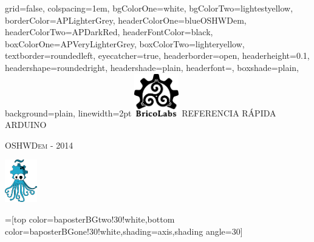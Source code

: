 \documentclass[landscape,final,a0paper]{baposter}
\begin{document}
\newlength{\leftimgwidth}
\begin{poster}%
  {
  grid=false, %
  colspacing=1em, %
  bgColorOne=white,
  bgColorTwo=lightestyellow,
  borderColor=APLighterGrey,
  headerColorOne=blueOSHWDem,
  headerColorTwo=APDarkRed,
  headerFontColor=black,
  boxColorOne=APVeryLighterGrey,
  boxColorTwo=lighteryellow,
  textborder=roundedleft,
  eyecatcher=true,
  headerborder=open,
  headerheight=0.1\textheight,
  headershape=roundedright,
  headershade=plain,
  headerfont=\Large\textsf, %
  boxshade=plain,
  background=plain,
  linewidth=2pt
  }
  {
  \includegraphics[height=5em]{bricolabs_logo.png}
  } %
  {\sf %
  REFERENCIA RÁPIDA ARDUINO}
  {\sf %
  \vspace{0.05em}
  \textsc{OSHWDem - 2014}


  }
  {
    \includegraphics[height=5em]{OSHWI_color.png} %
  }

  =[top color=baposterBGtwo!30!white,bottom color=baposterBGone!30!white,shading=axis,shading angle=30]

     \setlength{\leftimgwidth}{0.78em+8.0em}

    \newcommand{\colouredcircle}[1]{%
      \tikz{\useasboundingbox (-0.2em,-0.32em) rectangle(0.2em,0.32em); \draw[draw=black,fill=baposterBGone!80!black!#1!white,line width=0.03em] (0,0) circle(0.18em);}}


\end{poster}
\end{document}

